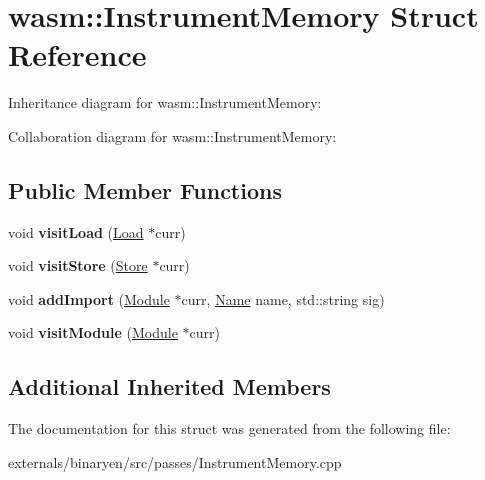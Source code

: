 \hypertarget{structwasm_1_1_instrument_memory}{}\section{wasm\+:\+:Instrument\+Memory Struct Reference}
\label{structwasm_1_1_instrument_memory}


Inheritance diagram for wasm\+:\+:Instrument\+Memory\+:


Collaboration diagram for wasm\+:\+:Instrument\+Memory\+:
\subsection*{Public Member Functions}
\begin{DoxyCompactItemize}
\item 
\mbox{\label{structwasm_1_1_instrument_memory_a0e7b9a109191e4c82b07422e32328033}} 
void {\bfseries visit\+Load} (\mbox{\hyperlink{classwasm_1_1_load}{Load}} $\ast$curr)
\item 
\mbox{\label{structwasm_1_1_instrument_memory_a665ed52cf68cc8e22cebf8a4a21a1f82}} 
void {\bfseries visit\+Store} (\mbox{\hyperlink{classwasm_1_1_store}{Store}} $\ast$curr)
\item 
\mbox{\label{structwasm_1_1_instrument_memory_aaf02294e9640beb85054289c1ab9c290}} 
void {\bfseries add\+Import} (\mbox{\hyperlink{classwasm_1_1_module}{Module}} $\ast$curr, \mbox{\hyperlink{structwasm_1_1_name}{Name}} name, std\+::string sig)
\item 
\mbox{\label{structwasm_1_1_instrument_memory_aba375dd5a56ce7c098ea44bdb67616b3}} 
void {\bfseries visit\+Module} (\mbox{\hyperlink{classwasm_1_1_module}{Module}} $\ast$curr)
\end{DoxyCompactItemize}
\subsection*{Additional Inherited Members}


The documentation for this struct was generated from the following file\+:\begin{DoxyCompactItemize}
\item 
externals/binaryen/src/passes/Instrument\+Memory.\+cpp\end{DoxyCompactItemize}
